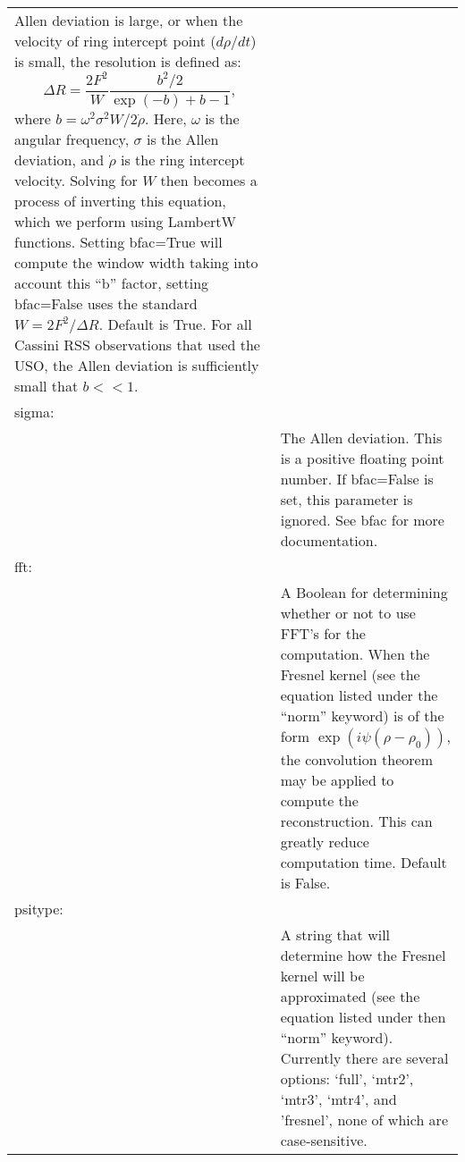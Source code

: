 \begin{table}[H]
\begin{tabular}{lp{5in}}
                     Allen deviation is large, or when the velocity
                     of ring intercept point ($d\rho/dt$) is small,
                     the resolution is defined as:
                     \begin{equation*}
                         \Delta{R}
                         =\frac{2F^{2}}{W}\frac{b^2/2}{\exp(-b)+b-1},
                     \end{equation*}
                    where $b=\omega^{2}\sigma^{2}W/2\dot{\rho}$.
                     Here, $\omega$ is the angular frequency,
                     $\sigma$ is the Allen deviation, and $\dot{\rho}$
                     is the ring intercept velocity. Solving
                     for $W$ then becomes a process of inverting this
                     equation, which we perform using LambertW functions.
                     Setting bfac=True will compute the window width
                     taking into account this ``b'' factor, setting
                     bfac=False uses the standard $W=2F^{2}/\Delta{R}$.
                     Default is True. For all Cassini RSS observations that used the USO, the Allen deviation is sufficiently small that $b<<1$.\\
                    sigma:&\\
                    &The Allen deviation. This is a positive floating
                     point number. If bfac=False is set, this parameter
                     is ignored. See bfac for more documentation.\\
                    fft:&\\
                     &A Boolean for determining whether or not to use
                      FFT's for the computation. When the Fresnel kernel
                      (see the equation listed under the ``norm''
                      keyword) is of the form
                      $\exp(i\psi(\rho-\rho_{0}))$, the convolution
                      theorem may be applied to compute the
                      reconstruction. This can greatly reduce
                      computation time. Default is False.\\
                    psitype:&\\
                    &A string that will determine how the Fresnel kernel
                     will be approximated (see the equation listed under
                     then ``norm'' keyword). Currently there are several
                     options: `full', `mtr2', `mtr3', `mtr4', and
                     'fresnel', none of which are case-sensitive.

\end{tabular}
\end{table}
